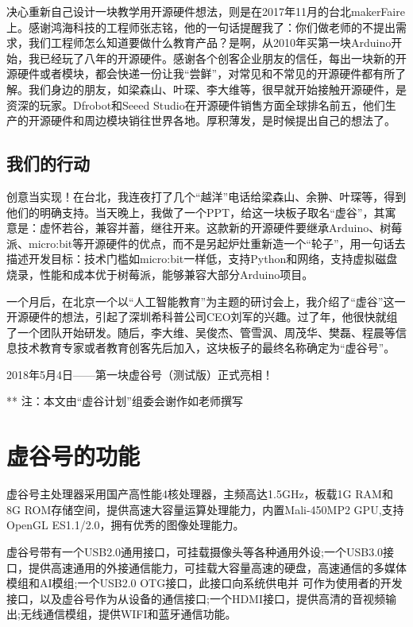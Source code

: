 \documentclass[letterpaper,10pt,english]{sphinxmanual}
\begin{document}
决心重新自己设计一块教学用开源硬件想法，则是在2017年11月的台北makerFaire上。感谢鸿海科技的工程师张志铭，他的一句话提醒我了：你们做老师的不提出需求，我们工程师怎么知道要做什么教育产品？是啊，从2010年买第一块Arduino开始，我已经玩了八年的开源硬件。感谢各个创客企业朋友的信任，每出一块新的开源硬件或者模块，都会快递一份让我“尝鲜”，对常见和不常见的开源硬件都有所了解。我们身边的朋友，如梁森山、叶琛、李大维等，很早就开始接触开源硬件，是资深的玩家。Dfrobot和Seeed Studio在开源硬件销售方面全球排名前五，他们生产的开源硬件和周边模块销往世界各地。厚积薄发，是时候提出自己的想法了。


\subsection{我们的行动}
\label{\detokenize{01.about/1.1-story:id4}}
创意当实现！在台北，我连夜打了几个“越洋”电话给梁森山、余翀、叶琛等，得到他们的明确支持。当天晚上，我做了一个PPT，给这一块板子取名“虚谷”，其寓意是：虚怀若谷，兼容并蓄，继往开来。这款新的开源硬件要继承Arduino、树莓派、micro:bit等开源硬件的优点，而不是另起炉灶重新造一个“轮子”，用一句话去描述开发目标：技术门槛如micro:bit一样低，支持Python和网络，支持虚拟磁盘烧录，性能和成本优于树莓派，能够兼容大部分Arduino项目。

一个月后，在北京一个以“人工智能教育”为主题的研讨会上，我介绍了“虚谷”这一开源硬件的想法，引起了深圳希科普公司CEO刘军的兴趣。过了年，他很快就组了一个团队开始研发。随后，李大维、吴俊杰、管雪沨、周茂华、樊磊、程晨等信息技术教育专家或者教育创客先后加入，这块板子的最终名称确定为“虚谷号”。

2018年5月4日——第一块虚谷号（测试版）正式亮相！

\noindent{}

** 注：本文由“虚谷计划”组委会谢作如老师撰写


\section{虚谷号的功能}
\label{\detokenize{01.about/1.2-function::doc}}\label{\detokenize{01.about/1.2-function:id1}}
虚谷号主处理器采用国产高性能4核处理器，主频高达1.5GHz，板载1G RAM和8G ROM存储空间，提供高速大容量运算处理能力，内置Mali-450MP2 GPU,支持OpenGL ES1.1/2.0，拥有优秀的图像处理能力。

虚谷号带有一个USB2.0通用接口，可挂载摄像头等各种通用外设;一个USB3.0接口，提供高速通用的外接通信能力，可挂载大容量高速的硬盘，高速通信的多媒体模组和AI模组;一个USB2.0 OTG接口，此接口向系统供电并 可作为使用者的开发接口，以及虚谷号作为从设备的通信接口;一个HDMI接口，提供高清的音视频输出;无线通信模组，提供WIFI和蓝牙通信功能。
\end{document}
